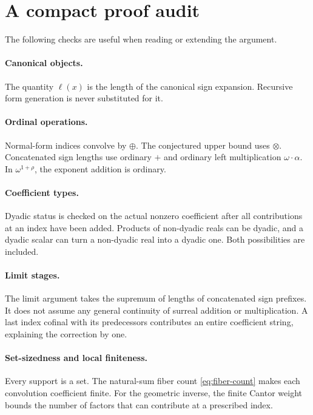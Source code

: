 \documentclass[11pt,letterpaper]{article}
\theoremstyle{definition}
\theoremstyle{remark}
\newcommand{\bd}{\ell}
\newcommand{\ns}{\mathbin{\oplus}}
\newcommand{\np}{\mathbin{\otimes}}
\begin{document}
\appendix
\section{A compact proof audit}

The following checks are useful when reading or extending the argument.

\paragraph{Canonical objects.}
The quantity \(\bd(x)\) is the length of the canonical sign expansion.
Recursive form generation is never substituted for it.

\paragraph{Ordinal operations.}
Normal-form indices convolve by \(\ns\). The conjectured upper bound
uses \(\np\). Concatenated sign lengths use ordinary \(+\) and
ordinary left multiplication \(\omega\cdot\alpha\). In
\(\omega^{1+\rho}\), the exponent addition is ordinary.

\paragraph{Coefficient types.}
Dyadic status is checked on the actual nonzero coefficient after all
contributions at an index have been added. Products of non-dyadic reals
can be dyadic, and a dyadic scalar can turn a non-dyadic real into a
dyadic one. Both possibilities are included.

\paragraph{Limit stages.}
The limit argument takes the supremum of lengths of concatenated sign
prefixes. It does not assume any general continuity of surreal addition
or multiplication. A last index cofinal with its predecessors contributes
an entire coefficient string, explaining the correction by one.

\paragraph{Set-sizedness and local finiteness.}
Every support is a set. The natural-sum fiber count
\eqref{eq:fiber-count} makes each convolution coefficient finite.
For the geometric inverse, the finite Cantor weight bounds the number
of factors that can contribute at a prescribed index.
\end{document}
